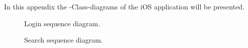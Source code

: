 \label{chap:ios_appendix}

In this appendix the -Class-diagrams of the iOS application will be
presented. 

\begin{figure}[ht]
\caption{Login sequence diagram.}
\label{fig:ios_sequence_login}
\end{figure}

\begin{figure}[ht]
\caption{Search sequence diagram.}
\label{fig:ios_sequence_search}
\end{figure}
\begin{comment}
\begin{figure}[ht]
\addScaledImageVertical{0.5}{ios_select_experiment_sequence_diagram.png}
\caption{Experiment selection sequence diagram.}
\label{fig:ios_sequence_experiment_selection}
\end{figure}

\begin{figure}[ht]
\addScaledImageVertical{0.5}{ios_select_file_sequence_diagram.png}
\caption{File selection sequence diagram.}
\label{fig:ios_sequence_file_selection}
\end{figure}

\begin{figure}[ht]
\addScaledImageVertical{0.5}{ios_send_convert_sequence_diagram.png}
\caption{Send convert request.}
\label{fig:ios_sequence_convert_request2}
\end{figure}
\end{comment}
\FloatBarrier